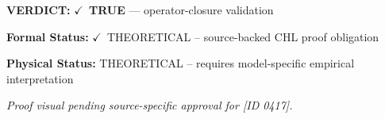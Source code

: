 \textbf{VERDICT:} \ensuremath{\checkmark}\ \textbf{TRUE} --- operator-closure validation

\textbf{Formal Status:} \ensuremath{\checkmark}\ THEORETICAL -- source-backed CHL proof obligation

\textbf{Physical Status:} THEORETICAL -- requires model-specific empirical interpretation
\par\vspace{0.45em}
\par
\vfill
\begingroup\footnotesize\itshape
Proof visual pending source-specific approval for [ID 0417].
\par\endgroup
\vfill
\endgroup
\endgroup
